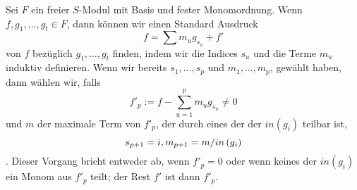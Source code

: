\documentclass{article}
\begin{document}
\begin{algo}
	Sei 
	\( F \)
	ein freier 
	\( S\)-Modul
	mit Basis und fester Monomordnung.
	Wenn
	\( f,g_1,\dots,g_t \in F \),
	dann k\"onnen wir einen Standard Ausdruck
	\[
                f=\sum m_u g_{s_u} +f'
	\]
	von
	\( f \)
	bez\"uglich 
	\( g_1,\dots,g_t \)
	finden,
	indem wir die Indices
	\( s_{u} \)
	und die Terme
	\(m_{u} \)
	induktiv definieren.
	{\color{red}
	Wenn wir bereits 
	\( s_1,\dots,s_p \)
	und
	\( m_1,\dots,m_p\),
	gew\"ahlt haben,
	dann w\"ahlen wir, 
	falls 
	\[
		f'_p:=f-\sum_{u=1}^{p} m_u g_{s_u} \neq 0
	\]
	und
	\( m \) 
	der maximale Term von 
	\(f'_p \),
	der durch eines der der
	\( in\left( g_i \right) \)
	teilbar ist,
	\[
		s_{p+1}=i , \\
		m_{p+1}=m / in\left( g_i \right)
	\].
	Dieser Vorgang bricht entweder ab, wenn 
	\( f'_p=0 \)
	oder wenn keines der
	\( in\left( g_i \right) \) 
	ein Monom aus 
	\( f'_p\)
	teilt;
	der Rest 
	\(f'\) 
	ist dann 
	\( f'_p \).
}
\end{algo}
\end{document}

